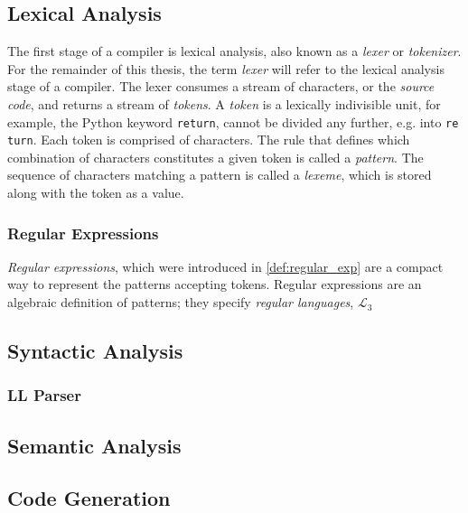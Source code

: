 \subsection*{Lexical Analysis}
The first stage of a compiler is lexical analysis, also known as a \emph{lexer} or \emph{tokenizer}. For the remainder of this thesis, the term \emph{lexer} will refer to the lexical analysis stage of a compiler. The lexer consumes a stream of characters, or the \emph{source code}, and returns a stream of \emph{tokens}. A \emph{token} is a lexically indivisible unit, for example, the Python keyword \texttt{return}, cannot be divided any further, e.g. into \texttt{re} \texttt{turn}. Each token is comprised of characters. The rule that defines which combination of characters constitutes a given token is called a \emph{pattern}. The sequence of characters matching a pattern is called a \emph{lexeme}, which is stored along with the token as a value.



\subsubsection*{Regular Expressions}
\emph{Regular expressions}, which were introduced in \cref{def:regular_exp} are a compact way to represent the patterns accepting tokens. Regular expressions are an algebraic definition of patterns; they specify \emph{regular languages}, $\mathcal{L}_3$

\subsection*{Syntactic Analysis}

\subsubsection*{LL Parser}

\subsection*{Semantic Analysis}

\subsection*{Code Generation}


